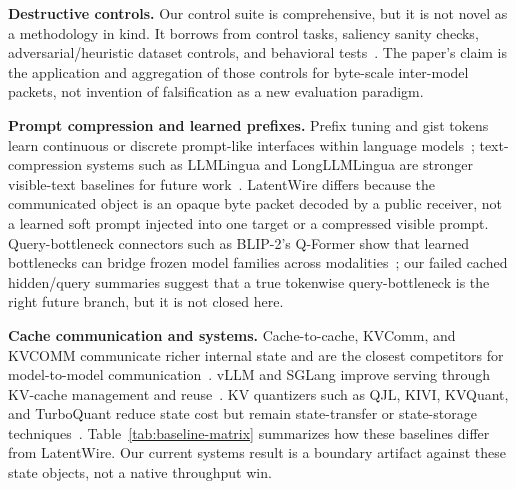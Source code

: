 \documentclass{article}
\newcommand{\method}{LatentWire}
\begin{document}
\textbf{Destructive controls.} Our control suite is comprehensive, but it is not novel as a methodology in kind. It borrows from control tasks, saliency sanity checks, adversarial/heuristic dataset controls, and behavioral tests~\citep{Hewitt2019ControlTasks,Adebayo2018SanityChecks,McCoy2019HANS,Ribeiro2020CheckList}. The paper's claim is the application and aggregation of those controls for byte-scale inter-model packets, not invention of falsification as a new evaluation paradigm.

\textbf{Prompt compression and learned prefixes.} Prefix tuning and gist tokens learn continuous or discrete prompt-like interfaces within language models~\citep{Li2021Prefix,Mu2023Gist}; text-compression systems such as LLMLingua and LongLLMLingua are stronger visible-text baselines for future work~\citep{Jiang2023LLMLingua,Jiang2023LongLLMLingua}. \method{} differs because the communicated object is an opaque byte packet decoded by a public receiver, not a learned soft prompt injected into one target or a compressed visible prompt. Query-bottleneck connectors such as BLIP-2's Q-Former show that learned bottlenecks can bridge frozen model families across modalities~\citep{Li2023BLIP2}; our failed cached hidden/query summaries suggest that a true tokenwise query-bottleneck is the right future branch, but it is not closed here.

\textbf{Cache communication and systems.} Cache-to-cache, KVComm, and KVCOMM communicate richer internal state and are the closest competitors for model-to-model communication~\citep{Fu2025C2C,Shi2025KVComm,Ye2025KVCOMM}. vLLM and SGLang improve serving through KV-cache management and reuse~\citep{Kwon2023vLLM,Zheng2023SGLang}. KV quantizers such as QJL, KIVI, KVQuant, and TurboQuant reduce state cost but remain state-transfer or state-storage techniques~\citep{Zandieh2024QJL,Liu2024KIVI,Hooper2024KVQuant,Zandieh2025TurboQuant}. Table~\ref{tab:baseline-matrix} summarizes how these baselines differ from \method{}. Our current systems result is a boundary artifact against these state objects, not a native throughput win.
\end{document}
